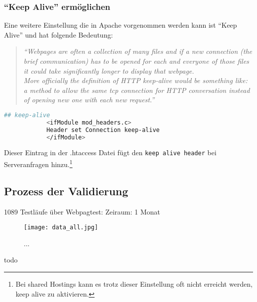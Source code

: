			\pagebreak

		\subsubsection{"`Keep Alive"' ermöglichen} %
		\label{ssub:keep_alive_ermöglichen}
			Eine weitere Einstellung die in Apache vorgenommen werden kann ist "`Keep Alive"' und hat folgende Bedeutung:
			\begin{quote}
				\textit{"`Webpages are often a collection of many files and if a new connection (the brief communication) has to be opened for each and everyone of those files it could take significantly longer to display that webpage.\\
				More officially the definition of HTTP keep-alive would be something like: a method to allow the same tcp connection for HTTP conversation instead of opening new one with each new request."'}\autocite{sextonAlive}
			\end{quote}

		\begin{lstlisting}[captionpos=b, caption=.htaccess Eintrag nach \autocite{sextonAlive}, label=lst:keepAlive, language=bash]
			## keep-alive
			<ifModule mod_headers.c> 
			Header set Connection keep-alive
			</ifModule>
		\end{lstlisting}
			
		Dieser Eintrag in der .htaccess Datei fügt den \texttt{keep alive header} bei Serveranfragen hinzu.\footnote{Bei shared Hostings kann es trotz dieser Einstellung oft nicht erreicht werden, keep alive zu aktivieren.}


	\subsection{Prozess der Validierung}
	\label{sub:prozess_der_validierung}

	1089 Testläufe über Webpagtest: Zeiraum: 1 Monat

	\begin{figure}[htbp]
		\begin{center}
			\texttt{[image: data\_all.jpg]}
			\caption{...}
			\label{fig:data_all}
		\end{center}
	\end{figure}
	
	todo
	

	

